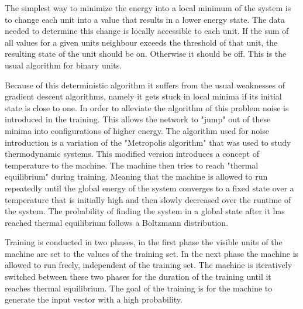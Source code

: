 The simplest way to minimize the energy into a local minimum of the system is to change each unit into a value that results in a lower energy state. The data needed to determine this change is locally accessible to each unit. If the sum of all values for a given units neighbour exceeds the threshold of that unit, the resulting state of the unit should be on. Otherwise it should be off. This is the usual algorithm for binary units.

Because of this deterministic algorithm it suffers from the usual weaknesses of gradient descent algorithms, namely it gets stuck in local minima if its initial state is close to one. In order to alleviate the algorithm of this problem noise is introduced in the training. This allows the network to "jump" out of these minima into configurations of higher energy. The algorithm used for noise introduction is a variation of the "Metropolis algorithm" \cite{metropolis1953equation} that was used to study thermodynamic systems. This modified version introduces a concept of temperature to the machine. The machine then tries to reach "thermal equilibrium" during training. Meaning that the machine is allowed to run repeatedly until the global energy of the system converges to a fixed state over a temperature that is initially high and then slowly decreased over the runtime of the system. The probability of finding the system in a global state after it has reached thermal equilibrium follows a Boltzmann distribution.


Training is conducted in two phases, in the first phase the visible units of the machine are set to the values of the training set. In the next phase the machine is allowed to run freely, independent of the training set. The machine is iteratively switched between these two phases for the duration of the training until it reaches thermal equilibrium. The goal of the training is for the machine to generate the input vector with a high probability.

